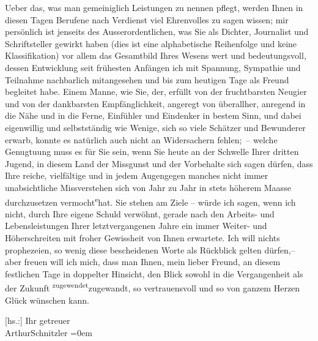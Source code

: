 \pstart
           Ueber das, was man gemeiniglich Leistungen zu nennen pflegt, werden Ihnen in diesen
               Tagen Berufene nach Verdienst viel Ehrenvolles zu sagen wissen; mir persönlich ist
                   jenseits 
               des Ausserordentlichen, was Sie als Dichter, Journalist und Schriftsteller gewirkt
               haben (dies ist eine alphabetische Reihenfolge und keine Klassifikation) {\pb}\introOben{}vor allem\introOben{} das Gesamtbild Ihres Wesens wert und
               bedeutungsvoll, dessen Entwicklung seit frühesten Anfängen ich mit Spannung,
               Sympathie und Teilnahme nachbarlich mitangesehen und bis zum heutigen Tage als Freund
               begleitet habe. Einem Manne, wie Sie, der, erfüllt von der fruchtbarsten Neugier und
               von der dankbarsten Empfänglichkeit, angeregt von überallher, anregend in die Nähe
               und in die Ferne, Einfühler und Eindenker in bestem Sinn, und dabei eigenwillig und
               selbstständig wie Wenige, sich so viele Schätzer und Bewunderer erwarb, konnte es
               natürlich auch nicht an Widersachern fehlen; – welche Genugtuung muss es für Sie sein,
               wenn Sie heute an der Schwelle Ihrer dritten Jugend, in diesem Land der Missgunst und
               der Vorbehalte sich sagen dürfen, dass Ihre reiche, vielfältige und in jedem
               Augen\label{T_L02950-1v}\label{T_L02950-1}{\pb}gegen
               manches nicht immer unabsichtliche Missverstehen sich von Jahr zu Jahr in stets
               höherem Maasse durchzusetzen vermocht\substVorne{}\textsuperscript{e}\substDazwischen{}{ }hat\substHinten{}. Sie stehen am Ziele – würde ich sagen, wenn ich nicht, durch Ihre eigene
               Schuld verwöhnt, gerade nach den Arbeits- und Lebensleistungen Ihrer letztvergangenen
               Jahre ein immer Weiter- und Höherschreiten mit froher Gewissheit von Ihnen erwartete.
               Ich will nichts prophezeien, so wenig diese bescheidenen Worte als Rückblick gelten
               dürfen,– aber freuen  will ich mich, dass man
               Ihnen, mein lieber Freund, an diesem festlichen Tage in doppelter Hinsicht, den Blick
               sowohl in die Vergangenheit als der Zukunft \substVorne{}\textsuperscript{zugewendet}\substDazwischen{}zugewandt\substHinten{}, so vertrauensvoll und so von ganzem Herzen Glück wünschen kann.\pend
           
\pstart
           {[}hs.:{]} Ihr getreuer{\\[\baselineskip]}\spacefill\mbox{ArthurSchnitzler}\pend
           \leftskip=0em{}\endnumbering{}  
      